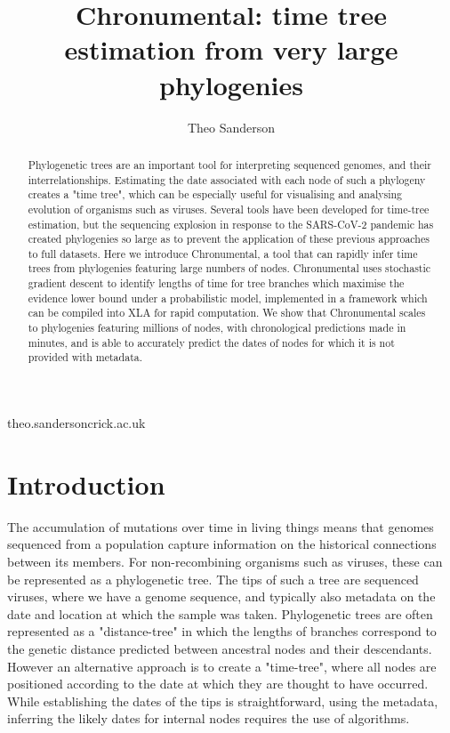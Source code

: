 
\title{Chronumental: time tree estimation from very large phylogenies}

\author[1,2]{Theo Sanderson}

\date{}

\maketitle

\begin{abstract}
Phylogenetic trees are an important tool for interpreting sequenced genomes, and their interrelationships. Estimating the date associated with each node of such a phylogeny creates a "time tree", which can be especially useful for visualising and analysing evolution of organisms such as viruses. Several tools have been developed for time-tree estimation, but the sequencing explosion in response to the SARS-CoV-2 pandemic has created phylogenies so large as to prevent the application of these previous approaches to full datasets. Here we introduce Chronumental, a tool that can rapidly infer time trees from phylogenies featuring large numbers of nodes. Chronumental uses stochastic gradient descent to identify lengths of time for tree branches which maximise the evidence lower bound under a probabilistic model, implemented in a framework which can be compiled into XLA for rapid computation. We show that Chronumental scales to phylogenies featuring millions of nodes, with chronological predictions made in minutes, and is able to accurately predict the dates of nodes for which it is not provided with metadata.
\end{abstract}

\begin{corrauthor}
theo.sanderson\at crick.ac.uk
\end{corrauthor}



\section*{Introduction}\label{s:introduction}
The accumulation of mutations over time in living things means that genomes sequenced from a population capture information on the historical connections between its members. For non-recombining organisms such as viruses, these can be represented as a phylogenetic tree. The tips of such a tree are sequenced viruses, where we have a genome sequence, and typically also metadata on the date and location at which the sample was taken. Phylogenetic trees are often represented as a "distance-tree" in which the lengths of branches correspond to the genetic distance predicted between ancestral nodes and their descendants. However an alternative approach is to create a "time-tree", where all nodes are positioned according to the date at which they are thought to have occurred. While establishing the dates of the tips is straightforward, using the metadata, inferring the likely dates for internal nodes requires the use of algorithms.



